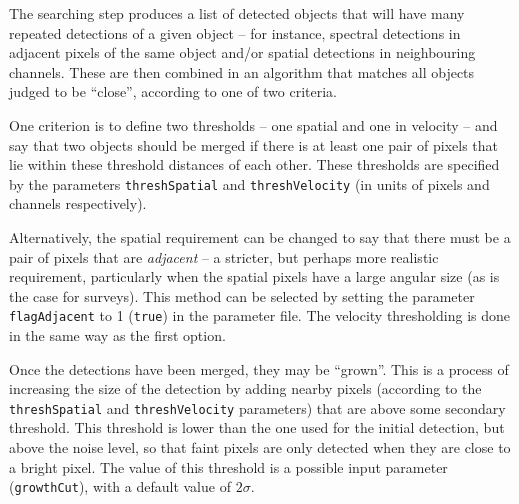 %

\label{sec-merger}

The searching step produces a list of detected objects that will have
many repeated detections of a given object -- for instance, spectral
detections in adjacent pixels of the same object and/or spatial
detections in neighbouring channels. These are then combined in an
algorithm that matches all objects judged to be ``close'', according
to one of two criteria.

One criterion is to define two thresholds -- one spatial and one in
velocity -- and say that two objects should be merged if there is at
least one pair of pixels that lie within these threshold distances of
each other. These thresholds are specified by the parameters
\texttt{threshSpatial} and \texttt{threshVelocity} (in units of pixels
and channels respectively).

Alternatively, the spatial requirement can be changed to say that
there must be a pair of pixels that are \emph{adjacent} -- a stricter,
but perhaps more realistic requirement, particularly when the spatial
pixels have a large angular size (as is the case for 
\hi surveys). This 
method can be selected by setting the parameter
\texttt{flagAdjacent} to 1 (\ie \texttt{true}) in the parameter
file. The velocity thresholding is done in the same way as the first
option.

Once the detections have been merged, they may be ``grown''. This is a
process of increasing the size of the detection by adding nearby
pixels (according to the \texttt{threshSpatial} and
\texttt{threshVelocity} parameters) that are above some secondary
threshold. This threshold is lower than the one used for the initial
detection, but above the noise level, so that faint pixels are only
detected when they are close to a bright pixel. The value of this
threshold is a possible input parameter (\texttt{growthCut}), with a
default value of $2\sigma$.

